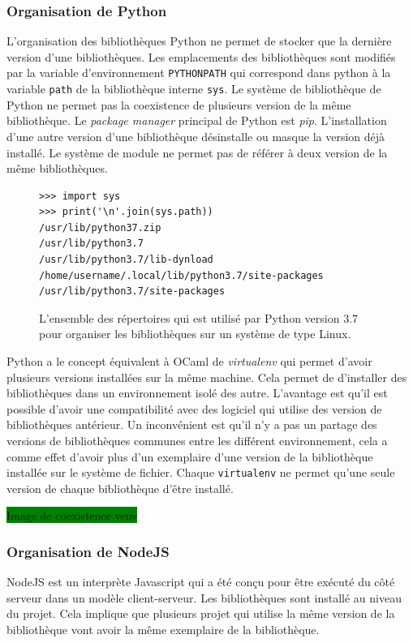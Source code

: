 \documentclass[12pt,initial,twoside,maitrise]{dms}
\newcommand{\todo}[1]{\noindent\colorbox{green}{#1\hspace{\textwidth}}}
\numberwithin{equation}{section}
\numberwithin{table}{chapter}
\numberwithin{figure}{chapter}
\begin{document}
\subsubsection{Organisation de Python}
L'organisation des bibliothèques Python ne permet de stocker que la dernière version
d'une bibliothèques. Les emplacements des bibliothèques sont modifiés par la variable d'environnement
\verb|PYTHONPATH| qui correspond dans python à la variable \verb|path| de la bibliothèque
interne \verb|sys|. Le système de bibliothèque de Python ne permet pas la coexistence de plusieurs
version de la même bibliothèque. Le \textit{package manager} principal de Python est \textit{pip}.
L'installation d'une autre version d'une bibliothèque désinstalle
ou masque la version déjà installé. Le système de module ne permet pas de référer à deux version
de la même bibliothèques.

\begin{figure}[ht]
    \begin{minipage}[t]{0.5\textwidth}
\begin{verbatim}
>>> import sys
>>> print('\n'.join(sys.path))
/usr/lib/python37.zip
/usr/lib/python3.7
/usr/lib/python3.7/lib-dynload
/home/username/.local/lib/python3.7/site-packages
/usr/lib/python3.7/site-packages
\end{verbatim}
    \end{minipage}
    \caption{L'ensemble des répertoires qui est utilisé par Python version 3.7
    pour organiser les bibliothèques sur un système de type Linux.}
\end{figure}

Python a le concept équivalent à OCaml de \textit{virtualenv} qui permet d'avoir plusieurs
versions installées sur la même machine. Cela permet de d'installer des
bibliothèques dans un environnement isolé des autre. L'avantage est qu'il est
possible d'avoir une compatibilité avec des logiciel qui utilise des version de
bibliothèques antérieur. Un inconvénient est qu'il n'y a pas un partage des
versions de bibliothèques communes entre les différent environnement, cela a
comme effet d'avoir plus d'un exemplaire d'une version de la bibliothèque installée
sur le système de fichier. Chaque \texttt{virtualenv} ne permet qu'une seule version de
chaque bibliothèque d'être installé.

\todo{\hspace{2.5in}Image de coexistence venv}

\subsubsection{Organisation de NodeJS}
NodeJS est un interprète Javascript qui a été conçu pour être exécuté
du côté serveur dans un modèle client-serveur. Les bibliothèques sont
installé au niveau du projet. Cela implique que plusieurs projet qui
utilise la même version de la bibliothèque vont avoir la même exemplaire
de la bibliothèque.
\end{document}
